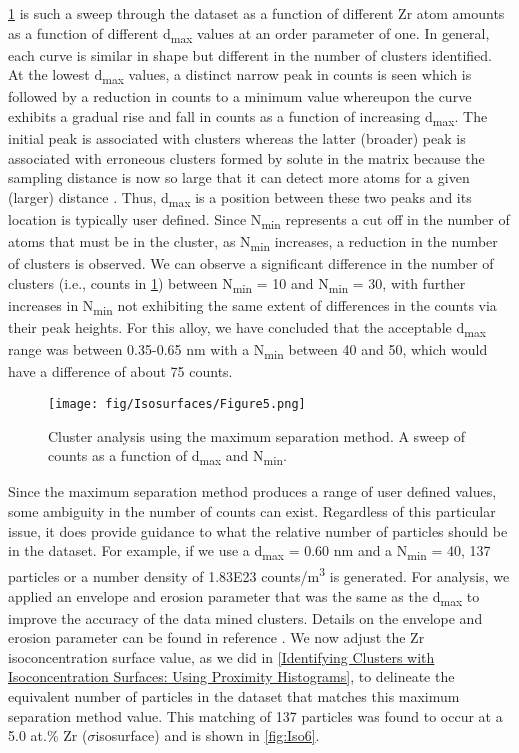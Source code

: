 		\ref{fig:Iso5} is such a sweep through the dataset as a function of different Zr atom amounts as a function of different d\textsubscript{max} values at an order parameter of one. In general, each curve is similar in shape but different in the number of clusters identified. At the lowest d\textsubscript{max} values, a distinct narrow peak in counts is seen which is followed by a reduction in counts to a minimum value whereupon the curve exhibits a gradual rise and fall in counts as a function of increasing d\textsubscript{max}. The initial peak is associated with clusters whereas the latter (broader) peak is associated with erroneous clusters formed by solute in the matrix because the sampling distance is now so large that it can detect more atoms for a given (larger) distance \cite{RN2674}. Thus, d\textsubscript{max} is a position between these two peaks and its location is typically user defined. Since N\textsubscript{min} represents a cut off in the number of atoms that must be in the cluster, as N\textsubscript{min} increases, a reduction in the number of clusters is observed. We can observe a significant difference in the number of clusters (i.e., counts in \ref{fig:Iso5}) between N\textsubscript{min} = 10 and N\textsubscript{min} = 30, with further increases in N\textsubscript{min} not exhibiting the same extent of differences in the counts via their peak heights. For this alloy, we have concluded that the acceptable d\textsubscript{max} range was between 0.35-0.65 nm with a N\textsubscript{min} between 40 and 50, which would have a difference of about 75 counts. 
		
		\begin{figure}
			\centering
			\texttt{[image: fig/Isosurfaces/Figure5.png]}
			\caption{Cluster analysis using the maximum separation method. A sweep of counts as
				a function of d\textsubscript{max} and N\textsubscript{min}.}
			\label{fig:Iso5}
		\end{figure}
		
		Since the maximum separation method produces a range of user defined values, some ambiguity in the number of counts can exist. Regardless of this particular issue, it does provide guidance to what the relative number of particles should be in the dataset. For example, if we use a d\textsubscript{max} = 0.60 nm and a N\textsubscript{min} = 40, 137 particles or a number density of 1.83E23 counts/m\textsuperscript{3} is generated. For analysis, we applied an envelope and erosion parameter that was the same as the d\textsubscript{max} to improve the accuracy of the data mined clusters. Details on the envelope and erosion parameter can be found in reference \cite{RN807,RN2620}. We now adjust the Zr isoconcentration surface value, as we did in \ref{Identifying Clusters with Isoconcentration Surfaces: Using Proximity Histograms}, to delineate the equivalent number of particles in the dataset that matches this maximum separation method value. This matching of 137 particles was found to occur at a 5.0 at.\% Zr ($\sigma${}isosurface) and is shown in \ref{fig:Iso6}.
		
